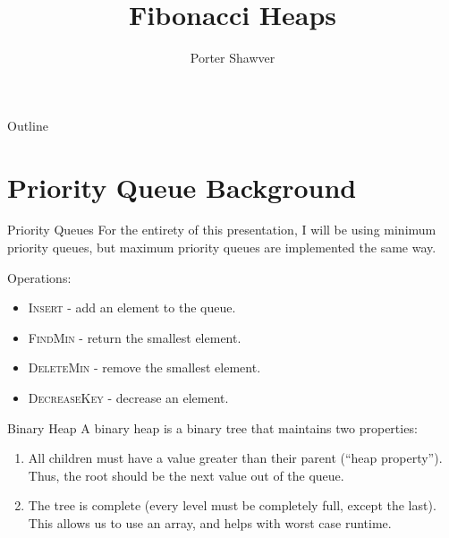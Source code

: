 \documentclass[aspectratio=169]{beamer}
\title{Fibonacci Heaps}
\subtitle{}
\author{Porter Shawver}
\date{}
\begin{document}

\begin{frame}
\titlepage
\end{frame}


\begin{frame}{Outline}
  \tableofcontents
\end{frame}


\section{Priority Queue Background}
\frame{\sectionpage}

\begin{frame}{Priority Queues}
    For the entirety of this presentation, I will be using minimum priority queues, but maximum priority queues are implemented the same way.

    Operations:
    \begin{itemize}
        \item \textsc{Insert} - add an element to the queue.
        \item \textsc{FindMin} - return the smallest element.
        \item \textsc{DeleteMin} - remove the smallest element.
        \item \textsc{DecreaseKey} - decrease an element.
    \end{itemize}
\end{frame}


\begin{frame}{Binary Heap}
    A binary heap is a binary tree that maintains two properties:
    \begin{enumerate}
        \pause
        \item All children must have a value greater than their parent (``heap property''). Thus, the root should be the next value out of the queue.
        \pause
        \item The tree is complete (every level must be completely full, except the last). This allows us to use an array, and helps with worst case runtime.
    \end{enumerate}
\end{frame}
\end{document}
